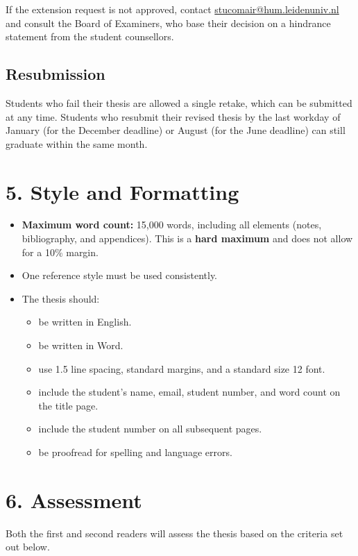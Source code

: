 \documentclass[11pt,a4paper]{article}
\begin{document}
If the extension request is not approved, contact \href{mailto:stucomair@hum.leidenuniv.nl}{stucomair@hum.leidenuniv.nl} and consult the Board of Examiners, who base their decision on a hindrance statement from the student counsellors.

\subsection{Resubmission}

Students who fail their thesis are allowed a single retake, which can be submitted at any time. Students who resubmit their revised thesis by the last workday of January (for the December deadline) or August (for the June deadline) can still graduate within the same month.

\section{5. Style and Formatting}

\begin{itemize}
    \item \textbf{Maximum word count:} 15,000 words, including all elements (notes, bibliography, and appendices). This is a \textbf{hard maximum} and does not allow for a 10\% margin.
    \item One reference style must be used consistently.
    \item The thesis should:
    \begin{itemize}
        \item be written in English.
        \item be written in Word.
        \item use 1.5 line spacing, standard margins, and a standard size 12 font.
        \item include the student's name, email, student number, and word count on the title page.
        \item include the student number on all subsequent pages.
        \item be proofread for spelling and language errors.
    \end{itemize}
\end{itemize}

\section{6. Assessment}

Both the first and second readers will assess the thesis based on the criteria set out below.
\end{document}
